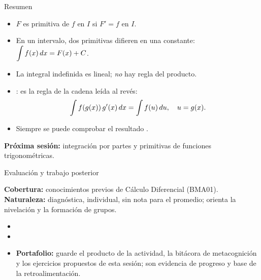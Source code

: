 \documentclass[10pt,aspectratio=169]{beamer}
\begin{document}
\begin{frame}{Resumen}
  \begin{itemize}
    \item $F$ es primitiva de $f$ en $I$ si $F'=f$ en $I$.
    \item En un intervalo, dos primitivas difieren en una constante:
      $\displaystyle\int f(x)\,dx=F(x)+C$.
    \item La integral indefinida es lineal; \emph{no} hay regla del producto.
    \item {}: es la regla de la cadena leída al revés:
      \[ \int f(g(x))\,g'(x)\,dx=\int f(u)\,du,\quad u=g(x). \]
    \item Siempre se puede comprobar el resultado .
  \end{itemize}
  \vspace{3mm}
  \textbf{Próxima sesión:} integración por partes y primitivas de funciones trigonométricas.
\end{frame}


\begin{frame}{Evaluación y trabajo posterior}
  \small
  \begin{evalbox}
    \textbf{Cobertura:} conocimientos previos de Cálculo Diferencial (BMA01). \textbf{Naturaleza:} diagnóstica, individual, sin nota para el promedio; orienta la nivelación y la formación de grupos.
  \end{evalbox}
  \begin{itemize}
    \item \criterios
    \item \declaracionia
    \item \textbf{Portafolio:} guarde el producto de la actividad, la bitácora de metacognición y los ejercicios propuestos de esta sesión; son evidencia de progreso y base de la retroalimentación.
  \end{itemize}
\end{frame}
\end{document}
